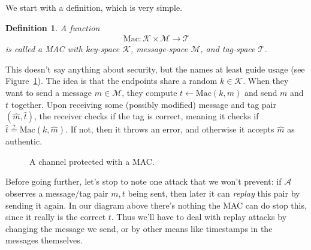 \documentclass[11pt]{article}
\newtheorem{definition}{Definition}
\newcommand{\msgs}{\mathcal{M}}
\newcommand{\keys}{\mathcal{K}}
\newcommand{\MAC}{\mathrm{Mac}}
\newcommand{\tags}{\mathcal{T}}
\newcommand{\testeq}{\stackrel{?}{=}}
\newcommand{\calA}{\mathcal{A}}
\newcommand{\hatt}{\hat{t}}
\newcommand{\hatm}{\hat{m}}
\begin{document}
We start with a definition, which is very simple.
\begin{definition}
    A function 
    \begin{align*}
        \MAC  : \keys\times\msgs  \to  \tags 
    \end{align*}
    is called a \emph{MAC} with key-space $\keys$, message-space $\msgs$,
    and tag-space $\tags$.
\end{definition}
This doesn't say anything about security, but the names at least guide usage
(see Figure~\ref{fig:macchannel}).  The idea is that the endpoints share a
random $k\in\keys$.  When they want to send a message $m\in\msgs$, they compute
$t\gets\MAC(k,m)$ and send $m$ and $t$ together.  Upon receiving some (possibly
modified) message and tag pair $(\hatm,\hatt)$, the receiver checks if the tag
is correct, meaning it checks if $\hatt \testeq \MAC(k,\hatm)$. If not, then it
throws an error, and otherwise it accepts $\hatm$ as authentic.

\begin{figure}[h]
\begin{center}
\end{center}
    \caption{A channel protected with a MAC.}
    \label{fig:macchannel}
\end{figure}

Before going further, let's stop to note one attack that we won't prevent: if
$\calA$ observes a message/tag pair $m,t$ being sent, then later it can
\emph{replay} this pair by sending it again. In our diagram above there's
nothing the MAC can do stop this, since it really is the correct $t$. Thus
we'll have to deal with replay attacks by changing the message we send, or
by other means like timestamps in the messages themselves.
\end{document}

